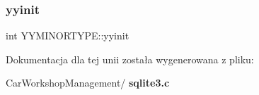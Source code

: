 \mbox{\label{union_y_y_m_i_n_o_r_t_y_p_e_a6cec97309f473b42b70a9738d7cbd5ba}} 
\subsubsection{yyinit}
{\footnotesize\ttfamily int Y\+Y\+M\+I\+N\+O\+R\+T\+Y\+P\+E\+::yyinit}



Dokumentacja dla tej unii została wygenerowana z pliku\+:\begin{DoxyCompactItemize}
\item 
Car\+Workshop\+Management/\textbf{ sqlite3.\+c}\end{DoxyCompactItemize}
